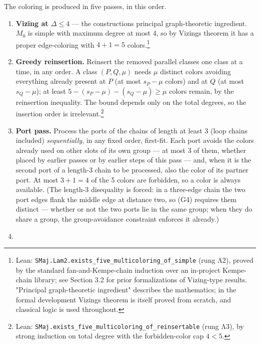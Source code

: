 \documentclass[11pt]{article}
\theoremstyle{definition}
\theoremstyle{remark}
\providecommand{\tightlist}{\setlength{\itemsep}{0pt}\setlength{\parskip}{0pt}}
\begin{document}
The coloring is produced in five passes, in this order.

\begin{enumerate}
\def\labelenumi{\arabic{enumi}.}
\tightlist
\item
  \textbf{Vizing at \(\Delta \le 4\)} --- the construction\textquotesingle s principal graph-theoretic ingredient. \(M_0\) is simple with maximum degree at most 4, so by Vizing\textquotesingle s theorem \cite{Viz} it has a proper edge-coloring with \(4 + 1 = 5\) colors.\footnote{Lean: \texttt{SMaj.Lam2.exists\_five\_multicoloring\_of\_simple} (rung Λ2), proved by the standard fan-and-Kempe-chain induction over an in-project Kempe-chain library; see Section 3.2 for prior formalizations of Vizing-type results. "Principal graph-theoretic ingredient" describes the mathematics; in the formal development Vizing\textquotesingle s theorem is itself proved from scratch, and classical logic is used throughout.}
\item
  \textbf{Greedy reinsertion.} Reinsert the removed parallel classes one class at a time, in any order. A class \((P, Q, \mu)\) needs \(\mu\) distinct colors avoiding everything already present at \(P\) (at most \(s_P - \mu\) colors) and at \(Q\) (at most \(s_Q - \mu\)); at least \(5 - (s_P - \mu) - (s_Q - \mu) \ge \mu\) colors remain, by the reinsertion inequality. The bound depends only on the total degrees, so the insertion order is irrelevant.\footnote{Lean: \texttt{SMaj.exists\_five\_multicoloring\_of\_reinsertable} (rung Λ3), by strong induction on total degree with the forbidden-color cap \(4 < 5\).}
\item
  \textbf{Port pass.} Process the ports of the chains of length at least 3 (loop chains included) \emph{sequentially}, in any fixed order, first-fit. Each port avoids the colors already used on other slots of its own group --- at most 3 of them, whether placed by earlier passes or by earlier steps of this pass --- and, when it is the second port of a length-3 chain to be processed, also the color of its partner port. At most \(3 + 1 = 4\) of the 5 colors are forbidden, so a color is always available. (The length-3 disequality is forced: in a three-edge chain the two port edges flank the middle edge at distance two, so (G4) requires them distinct --- whether or not the two ports lie in the same group; when they do share a group, the group-avoidance constraint enforces it already.)
\item

\end{enumerate}
\end{document}
